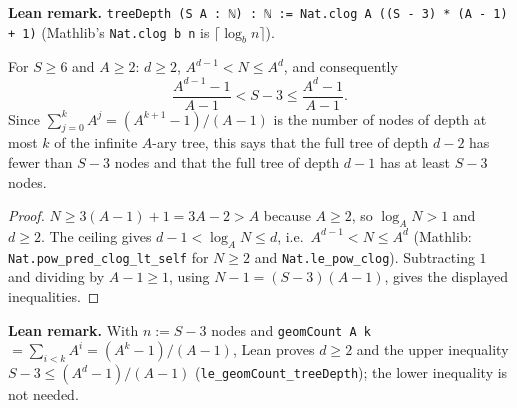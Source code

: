 \textbf{Lean remark.} \texttt{treeDepth (S A : ℕ) : ℕ := Nat.clog A ((S - 3) * (A - 1) + 1)}
(Mathlib's \texttt{Nat.clog b n} is $\lceil\log_b n\rceil$).

\begin{lemma}\label{lem:tree_depth_props}
\leanok
For $S \ge 6$ and $A \ge 2$: $d \ge 2$, $A^{d-1} < N \le A^d$, and consequently
\[
  \frac{A^{d-1} - 1}{A - 1} < S - 3 \le \frac{A^d - 1}{A - 1} .
\]
Since $\sum_{j=0}^{k} A^j = (A^{k+1} - 1)/(A - 1)$ is the number of nodes of depth at most $k$ of
the infinite $A$-ary tree, this says that the full tree of depth $d - 2$ has fewer than $S - 3$
nodes and that the full tree of depth $d - 1$ has at least $S - 3$ nodes.
\end{lemma}

\begin{proof}
\leanok
{}
$N \ge 3(A - 1) + 1 = 3A - 2 > A$ because $A \ge 2$, so $\log_A N > 1$ and $d \ge 2$. The
ceiling gives $d - 1 < \log_A N \le d$, i.e.\ $A^{d-1} < N \le A^d$ (Mathlib:
\texttt{Nat.pow\_pred\_clog\_lt\_self} for $N \ge 2$ and \texttt{Nat.le\_pow\_clog}). Subtracting
$1$ and dividing by $A - 1 \ge 1$, using $N - 1 = (S-3)(A-1)$, gives the displayed inequalities.
\end{proof}

\textbf{Lean remark.} With $n := S - 3$ nodes and \texttt{geomCount A k} $= \sum_{i<k} A^i = (A^k - 1)/(A - 1)$,
Lean proves $d \ge 2$ and the upper inequality $S - 3 \le (A^d - 1)/(A-1)$ (\texttt{le\_geomCount\_treeDepth});
the lower inequality is not needed.

